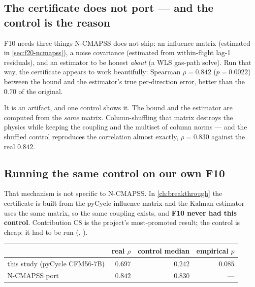 \subsection{The certificate does not port --- and the control is the reason}

F10 needs three things N-CMAPSS does not ship: an influence matrix (estimated in
\cref{sec:f20-ncmapss}), a noise covariance (estimated from within-flight lag-1 residuals), and
an estimator to be honest \emph{about} (a WLS gas-path solve). Run that way, the certificate
appears to work beautifully: Spearman $\rho = 0.842$ ($p = 0.0022$) between the bound and the
estimator's true per-direction error, better than the $0.70$ of the original.

It is an artifact, and one control shows it. The bound and the estimator are computed from the
\emph{same} matrix. Column-shuffling that matrix destroys the physics while keeping the coupling
and the multiset of column norms --- and the shuffled control reproduces the correlation almost
exactly, $\rho = 0.830$ against the real $0.842$.


\subsection{Running the same control on our own F10}

That mechanism is not specific to N-CMAPSS. In \cref{ch:breakthrough} the certificate is built
from the pyCycle influence matrix and the Kalman estimator uses the same matrix, so the same
coupling exists, and \textbf{F10 never had this control}. Contribution C8 is the project's
most-promoted result; the control is cheap; it had to be run
(, ).

\begin{center}\small
\begin{tabular}{@{}lrrr@{}}
  \toprule
  & real $\rho$ & control median & empirical $p$ \\
  \midrule
  this study (pyCycle CFM56-7B) & $\mathbf{0.697}$ & $0.242$ & $0.085$ \\
  N-CMAPSS port                 & $0.842$ & $0.830$ & --- \\
  \bottomrule
\end{tabular}
\end{center}

